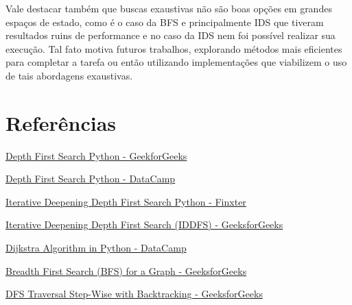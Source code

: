\documentclass[10pt]{extarticle} %
\begin{document}
Vale destacar também que buscas exaustivas não são boas opções em grandes espaços de estado, como é o caso da BFS e principalmente IDS que tiveram resultados ruins de performance e no caso da IDS nem foi possível realizar sua execução. Tal fato motiva futuros trabalhos, explorando métodos mais eficientes para completar a tarefa ou então utilizando implementações que viabilizem o uso de tais abordagens exaustivas.

\section{Referências}

\noindent \href{https://www.geeksforgeeks.org/depth-first-search-or-dfs-for-a-graph/}{Depth First Search Python - GeekforGeeks}

\noindent \href{https://www.datacamp.com/tutorial/depth-first-search-in-python}{Depth First Search Python - DataCamp}

\noindent \href{https://academy.finxter.com/python-iterative-deepening-depth-first-search-dfs-algorithm/}{Iterative Deepening Depth First Search Python - Finxter}

\noindent \href{https://www.geeksforgeeks.org/iterative-deepening-searchids-iterative-deepening-depth-first-searchiddfs/}{Iterative Deepening Depth First Search (IDDFS) - GeeksforGeeks}

\noindent \href{https://www.datacamp.com/tutorial/dijkstra-algorithm-in-python}{Dijkstra Algorithm in Python - DataCamp}

\noindent \href{https://www.geeksforgeeks.org/breadth-first-search-or-bfs-for-a-graph/}{Breadth First Search (BFS) for a Graph - GeeksforGeeks}

\noindent \href{https://www.geeksforgeeks.org/print-the-dfs-traversal-step-wise-backtracking-also/}{DFS Traversal Step-Wise with Backtracking - GeeksforGeeks}
\end{document}
